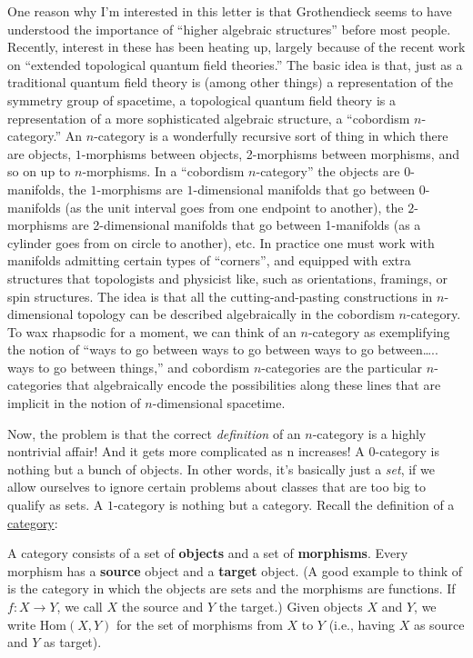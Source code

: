 \documentclass{article}
\begin{document}
One reason why I'm interested in this letter is that Grothendieck seems
to have understood the importance of ``higher algebraic structures''
before most people. Recently, interest in these has been heating up,
largely because of the recent work on ``extended topological quantum
field theories.'' The basic idea is that, just as a traditional quantum
field theory is (among other things) a representation of the symmetry
group of spacetime, a topological quantum field theory is a
representation of a more sophisticated algebraic structure, a
``cobordism \(n\)-category.'' An \(n\)-category is a wonderfully
recursive sort of thing in which there are objects, \(1\)-morphisms
between objects, 2-morphisms between morphisms, and so on up to
\(n\)-morphisms. In a ``cobordism \(n\)-category'' the objects are
0-manifolds, the \(1\)-morphisms are \(1\)-dimensional manifolds that go
between 0-manifolds (as the unit interval goes from one endpoint to
another), the \(2\)-morphisms are 2-dimensional manifolds that go
between 1-manifolds (as a cylinder goes from on circle to another), etc.
In practice one must work with manifolds admitting certain types of
``corners'', and equipped with extra structures that topologists and
physicist like, such as orientations, framings, or spin structures. The
idea is that all the cutting-and-pasting constructions in
\(n\)-dimensional topology can be described algebraically in the
cobordism \(n\)-category. To wax rhapsodic for a moment, we can think of
an \(n\)-category as exemplifying the notion of ``ways to go between
ways to go between ways to go between\ldots.. ways to go between
things,'' and cobordism \(n\)-categories are the particular
\(n\)-categories that algebraically encode the possibilities along these
lines that are implicit in the notion of \(n\)-dimensional spacetime.

Now, the problem is that the correct \emph{definition} of an
\(n\)-category is a highly nontrivial affair! And it gets more
complicated as n increases! A 0-category is nothing but a bunch of
objects. In other words, it's basically just a \emph{set}, if we allow
ourselves to ignore certain problems about classes that are too big to
qualify as sets. A \(1\)-category is nothing but a category. Recall the
definition of a
\href{http://math.ucr.edu/home/baez/categories.html}{category}:

A category consists of a set of \textbf{objects} and a set of
\textbf{morphisms}. Every morphism has a \textbf{source} object and a
\textbf{target} object. (A good example to think of is the category in
which the objects are sets and the morphisms are functions. If
\(f\colon X\to Y\), we call \(X\) the source and \(Y\) the target.)
Given objects \(X\) and \(Y\), we write \(\mathrm{Hom}(X,Y)\) for the
set of morphisms from \(X\) to \(Y\) (i.e., having \(X\) as source and
\(Y\) as target).
\end{document}
